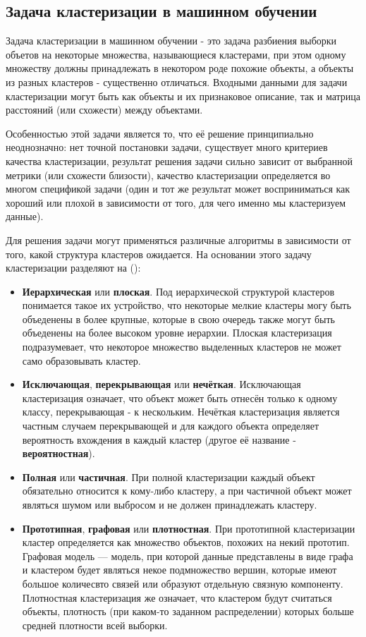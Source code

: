 \documentclass[12pt,fleqn]{article}
\begin{document}
\subsection{Задача кластеризации в машинном обучении}

Задача кластеризации в машинном обучении - это задача разбиения выборки объетов на некоторые множества, называющиеся кластерами, при этом одному множеству должны принадлежать в некотором роде похожие объекты, а объекты из разных кластеров - существенно отличаться. Входными данными для задачи кластеризации могут быть как объекты и их признаковое описание, так и матрица расстояний (или схожести) между объектами. 

Особенностью этой задачи является то, что её решение принципиально неоднозначно: нет точной постановки задачи, существует много критериев качества кластеризации, результат решения задачи сильно зависит от выбранной метрики (или схожести близости), качество кластеризации определяется во многом спецификой задачи (один и тот же результат может восприниматься как хороший или плохой в зависимости от того, для чего именно мы кластеризуем данные).


Для решения задачи могут применяться различные алгоритмы в зависимости от того, какой структура кластеров ожидается. На основании этого задачу кластеризации разделяют на (\cite{cluster_class}):
\begin{itemize}
\item \textbf{Иерархическая} или \textbf{плоская}. Под иерархической  структурой кластеров понимается такое их устройство, что некоторые мелкие кластеры могу быть объеденены в более крупные, которые в свою очередь также могут быть объеденены на более высоком уровне иерархии. Плоская кластеризация подразумевает, что некоторое множество выделенных кластеров не может само образовывать кластер.
\item \textbf{Исключающая}, \textbf{перекрывающая} или \textbf{нечёткая}. Исключающая кластеризация означает, что объект может быть отнесён только к одному классу, перекрывающая - к нескольким. Нечёткая кластеризация является частным случаем перекрывающей и для каждого объекта определяет вероятность вхождения в каждый кластер (другое её название - \textbf{вероятностная}).
\item \textbf{Полная} или \textbf{частичная}. При полной кластеризации каждый объект обязательно относится к кому-либо кластеру, а при частичной объект может являться шумом или выбросом и не должен принадлежать кластеру.
\item \textbf{Прототипная}, \textbf{графовая} или \textbf{плотностная}. При прототипной кластеризации кластер определяется как множество объектов, похожих на некий прототип. Графовая модель --- модель, при которой данные представлены в виде графа и кластером будет являться некое подмножество вершин, которые имеют большое количесвто связей или образуют отдельную связную компоненту. Плотностная кластеризация же означает, что кластером будут считаться объекты, плотность (при каком-то заданном распределении) которых больше средней плотности всей выборки.
\end{itemize}
\end{document}
